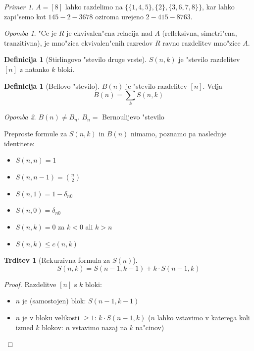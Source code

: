 \documentclass[a4paper,12pt]{article}
\theoremstyle{definition}
\newtheorem{defn}[counter]{Definicija}
\newtheorem{claim}[counter]{Trditev}
\theoremstyle{remark}
\newtheorem*{ex}{Primer}
\newtheorem*{rem}{Opomba}
\begin{document}
\begin{ex}
	$A = [8]$ lahko razdelimo na $\{ \{1, 4, 5\}, \{2\}, \{3, 6, 7, 8\}\}$, kar lahko zapi"semo kot $145-2-3678$ oziroma urejeno $2-415-8763$.
\end{ex}
\begin{rem}
	"Ce je $R$ je ekvivalen"cna relacija nad $A$ (refleksivna, simetri"cna, tranzitivna), je mno"zica ekvivalen"cnih razredov $R$ ravno razdelitev mno"zice $A$.
\end{rem}

\begin{defn}[Stirlingovo "stevilo druge vrste]
    $S(n,k)$ je "stevilo razdelitev $[n]$ z natanko $k$ bloki.
\end{defn}
\begin{defn}[Bellovo "stevilo]
	$B(n)$ je "stevilo razdelitev $[n]$. Velja
	\[B(n) = \sum_k S(n,k)\]
\end{defn}

\begin{rem}
	$B(n) \neq B_n$. $B_n =$ Bernoulijevo "stevilo
\end{rem}

Preproste formule za $S(n,k)$ in $B(n)$ nimamo, poznamo pa naslednje identitete:
\begin{itemize}
	\item $S(n,n) = 1$
	\item $S(n,n-1) = \binom{n}{2}$
	\item $S(n,1) = 1 - \delta_{n0}$
	\item $S(n,0) = \delta_{n0}$
	\item $S(n,k) = 0$ za $k < 0$ ali $k > n$
	\item $S(n,k) \leqslant c(n,k)$
\end{itemize}

\begin{claim}[Rekurzivna formula za $S(n)$]
    \[S(n, k) = S(n-1, k-1) + k \cdot S(n-1, k)\]
\end{claim}

\begin{proof}
    Razdelitve $[n]$ s $k$ bloki:
    \begin{itemize}
        \item $n$ je (samostojen) blok: $S(n-1, k-1)$
        \item $n$ je v bloku velikosti $\geq 1$: $k \cdot S(n-1, k)$ ($n$ lahko vstavimo v katerega koli izmed $k$ blokov: $n$ vstavimo nazaj na $k$ na"cinov)
    \end{itemize}
\end{proof}
\end{document}

